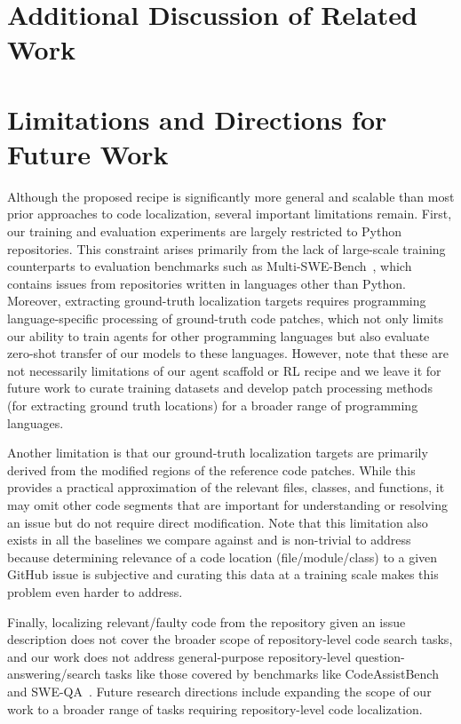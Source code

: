 
\section{Additional Discussion of Related Work}\label{appendix:related_work_detailed}


\section{Limitations and Directions for Future Work}\label{appendix:future_work}
Although the proposed \methodname recipe is significantly more general and scalable than most prior approaches to code localization, several important limitations remain. First, our training and evaluation experiments are largely restricted to Python repositories. This constraint arises primarily from the lack of large-scale training counterparts to evaluation benchmarks such as Multi-SWE-Bench~\citep{zan2025multiswebench}, which contains issues from repositories written in languages other than Python. Moreover, extracting ground-truth localization targets requires programming language-specific processing of ground-truth code patches, which not only limits our ability to train agents for other programming languages but also evaluate zero-shot transfer of our models to these languages. However, note that these are not necessarily limitations of our agent scaffold or RL recipe and we leave it for future work to curate training datasets and develop patch processing methods (for extracting ground truth locations) for a broader range of programming languages.

Another limitation is that our ground-truth localization targets are primarily derived from the modified regions of the reference code patches. While this provides a practical approximation of the relevant files, classes, and functions, it may omit other code segments that are important for understanding or resolving an issue but do not require direct modification. Note that this limitation also exists in all the baselines we compare \methodname against and is non-trivial to address because determining relevance of a code location (file/module/class) to a given GitHub issue is subjective and curating this data at a training scale makes this problem even harder to address.

Finally, localizing relevant/faulty code from the repository given an issue description does not cover the broader scope of repository-level code search tasks, and our work does not address general-purpose repository-level question-answering/search tasks like those covered by benchmarks like CodeAssistBench~\citep{kim2026codeassistbenchcabdataset} and SWE-QA~\citep{peng2025sweqalanguagemodelsanswer}. Future research directions include expanding the scope of our work to a broader range of tasks requiring repository-level code localization.

